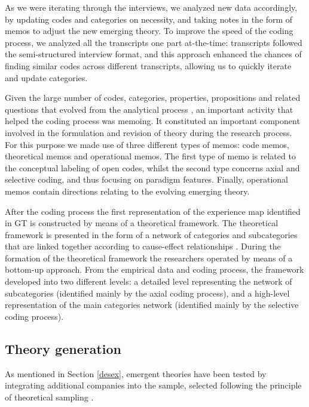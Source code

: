 \documentclass[10pt,journal,letterpaper,compsoc]{IEEEtran}
\begin{document}
As we were iterating through the interviews, we analyzed new data accordingly,
by updating codes and categories on necessity, and taking notes in the form of
memos to adjust the new emerging theory. To improve the speed of the coding
process, we analyzed all the transcripts one part at-the-time: transcripts
followed the semi-structured interview format, and this approach enhanced the
chances of finding similar codes across different transcripts, allowing us to
quickly iterate and update categories.

Given the large number of codes, categories, properties, propositions and
related questions that evolved from the analytical process \cite{Corbin1990},
an important activity that helped the coding process was memoing. It constituted
an important component involved in the formulation and revision of theory
during the research process. For this purpose we made use of three different
types of memos: code memos, theoretical memos and operational memos. The first
type of memo is related to the conceptual labeling of open codes, whilst the
second type concerns axial and selective coding, and thus focusing on paradigm
features. Finally, operational memos contain directions relating to the evolving
emerging theory.

After the coding process the first representation of the experience map
identified in GT is constructed by means of a theoretical framework. The
theoretical framework is presented in the form of a network of categories and
subcategories that are linked together according to cause-effect relationships
\cite{Corbin1990}. During the formation of the theoretical framework the
researchers operated by means of a  bottom-up approach. From the empirical data
and coding process, the framework developed into two different levels: a
detailed level representing the network of subcategories (identified mainly by
the axial coding process), and a high-level representation of the main
categories network (identified mainly by the selective coding process).

\subsection{Theory generation}

As mentioned in Section \ref{desex}, emergent theories have been tested by
integrating additional companies into the sample, selected following the
principle of theoretical sampling \cite{Yin1994}.
\end{document}
